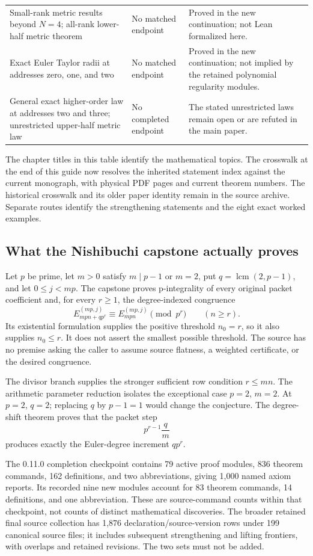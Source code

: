 \begin{longtable}{p{.32\linewidth}p{.30\linewidth}p{.29\linewidth}}
Small-rank metric results beyond $N=4$; all-rank lower-half metric theorem & No matched endpoint & Proved in the new continuation; not Lean formalized here.\\
Exact Euler Taylor radii at addresses zero, one, and two & No matched endpoint & Proved in the new continuation; not implied by the retained polynomial regularity modules.\\
General exact higher-order law at addresses two and three; unrestricted upper-half metric law & No completed endpoint & The stated unrestricted laws remain open or are refuted in the main paper.\\
\bottomrule\end{longtable}

The chapter titles in this table identify the mathematical topics. The crosswalk at the end of this guide now resolves the inherited statement index against the current monograph, with physical PDF pages and current theorem numbers. The historical crosswalk and its older paper identity remain in the source archive. Separate routes identify the strengthening statements and the eight exact worked examples.

\subsection{What the Nishibuchi capstone actually proves}
Let $p$ be prime, let $m>0$ satisfy $m\mid p-1$ or $m=2$, put $q=\operatorname{lcm}(2,p-1)$, and let $0\le j<mp$. The capstone proves p-integrality of every original packet coefficient and, for every $r\ge1$, the degree-indexed congruence
\[
 E_{mpn+qp^r}^{(mp,j)}\equiv E_{mpn}^{(mp,j)}\pmod{p^r}
 \qquad(n\ge r).
\]
Its existential formulation supplies the positive threshold $n_0=r$, so it also supplies $n_0\le r$. It does not assert the smallest possible threshold. The source has no premise asking the caller to assume source flatness, a weighted certificate, or the desired congruence.

The divisor branch supplies the stronger sufficient row condition $r\le mn$. The arithmetic parameter reduction isolates the exceptional case $p=2$, $m=2$. At $p=2$, $q=2$; replacing $q$ by $p-1=1$ would change the conjecture. The degree-shift theorem proves that the packet step
\[
 p^{r-1}\frac{q}{m}
\]
produces exactly the Euler-degree increment $qp^r$.

The 0.11.0 completion checkpoint contains 79 active proof modules, 836 theorem commands, 162 definitions, and two abbreviations, giving 1,000 named axiom reports. Its recorded nine new modules account for 83 theorem commands, 14 definitions, and one abbreviation. These are source-command counts within that checkpoint, not counts of distinct mathematical discoveries. The broader retained final source collection has 1,876 declaration/source-version rows under 199 canonical source files; it includes subsequent strengthening and lifting frontiers, with overlaps and retained revisions. The two sets must not be added.

